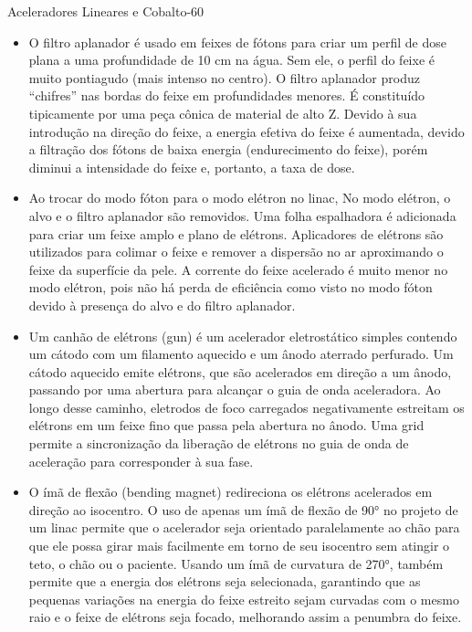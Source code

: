 \documentclass[11pt,a4paper]{article}
\newcounter{exemplo}
\begin{document}
\begin{exemplo}
	\textcolor{CarnationPink}{Aceleradores Lineares e Cobalto-60}
	\begin{itemize}
		\item O filtro aplanador é usado em feixes de fótons para criar um perfil de dose plana a uma profundidade de 10 cm na água. Sem ele, o perfil do feixe é muito pontiagudo (mais intenso no centro). O filtro aplanador produz ``chifres'' nas bordas do feixe em profundidades menores. É constituído tipicamente por uma peça cônica de material de alto Z. Devido à sua introdução na direção do feixe, a energia efetiva do feixe é aumentada, devido a filtração dos fótons de baixa energia (endurecimento do feixe), porém diminui a intensidade do feixe e, portanto, a taxa de dose.
		
		\item Ao trocar do modo fóton para o modo elétron no linac, No modo elétron, o alvo e o filtro aplanador são removidos. Uma folha espalhadora é adicionada para criar um feixe amplo e plano de elétrons. Aplicadores de elétrons são utilizados para colimar o feixe e remover a dispersão no ar aproximando o feixe da superfície da pele. A corrente do feixe acelerado é muito menor no modo elétron, pois não há perda de eficiência como visto no modo fóton devido à presença do alvo e do filtro aplanador.
		
		\item Um canhão de elétrons (gun) é um acelerador eletrostático simples contendo um cátodo com um filamento aquecido e um ânodo aterrado perfurado. Um cátodo aquecido emite elétrons, que são acelerados em direção a um ânodo, passando por uma abertura para alcançar o guia de onda aceleradora. Ao longo desse caminho, eletrodos de foco carregados negativamente estreitam os elétrons em um feixe fino que passa pela abertura no ânodo. Uma grid permite a sincronização da liberação de elétrons no guia de onda de aceleração para corresponder à sua fase.
		
		\item O ímã de flexão (bending magnet) redireciona os elétrons acelerados em direção ao isocentro. O uso de apenas um ímã de flexão de 90° no projeto de um linac permite que o acelerador seja orientado paralelamente ao chão para que ele possa girar mais facilmente em torno de seu isocentro sem atingir o teto, o chão ou o paciente. Usando um ímã de curvatura de 270°, também permite que a energia dos elétrons seja selecionada, garantindo que as pequenas variações na energia do feixe estreito sejam curvadas com o mesmo raio e o feixe de elétrons seja focado, melhorando assim a penumbra do feixe.
		

\end{itemize}
\end{exemplo}
\end{document}
